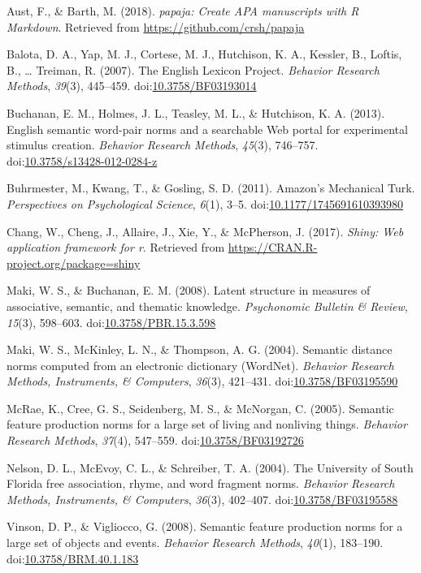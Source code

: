 \documentclass[english,man]{apa6}
\theoremstyle{definition}
\theoremstyle{definition}
\theoremstyle{definition}
\theoremstyle{remark}
\begin{document}
\setlength{\parindent}{-0.5in} \setlength{\leftskip}{0.5in}

\hypertarget{refs}{}
\hypertarget{ref-R-papaja}{}
Aust, F., \& Barth, M. (2018). \emph{papaja: Create APA manuscripts with
R Markdown}. Retrieved from \url{https://github.com/crsh/papaja}

\hypertarget{ref-Balota2007}{}
Balota, D. A., Yap, M. J., Cortese, M. J., Hutchison, K. A., Kessler,
B., Loftis, B., \ldots{} Treiman, R. (2007). The English Lexicon
Project. \emph{Behavior Research Methods}, \emph{39}(3), 445--459.
doi:\href{https://doi.org/10.3758/BF03193014}{10.3758/BF03193014}

\hypertarget{ref-Buchanan2013}{}
Buchanan, E. M., Holmes, J. L., Teasley, M. L., \& Hutchison, K. A.
(2013). English semantic word-pair norms and a searchable Web portal for
experimental stimulus creation. \emph{Behavior Research Methods},
\emph{45}(3), 746--757.
doi:\href{https://doi.org/10.3758/s13428-012-0284-z}{10.3758/s13428-012-0284-z}

\hypertarget{ref-Buhrmester2011}{}
Buhrmester, M., Kwang, T., \& Gosling, S. D. (2011). Amazon's Mechanical
Turk. \emph{Perspectives on Psychological Science}, \emph{6}(1), 3--5.
doi:\href{https://doi.org/10.1177/1745691610393980}{10.1177/1745691610393980}

\hypertarget{ref-R-shiny}{}
Chang, W., Cheng, J., Allaire, J., Xie, Y., \& McPherson, J. (2017).
\emph{Shiny: Web application framework for r}. Retrieved from
\url{https://CRAN.R-project.org/package=shiny}

\hypertarget{ref-Maki2008}{}
Maki, W. S., \& Buchanan, E. M. (2008). Latent structure in measures of
associative, semantic, and thematic knowledge. \emph{Psychonomic
Bulletin \& Review}, \emph{15}(3), 598--603.
doi:\href{https://doi.org/10.3758/PBR.15.3.598}{10.3758/PBR.15.3.598}

\hypertarget{ref-Maki2004}{}
Maki, W. S., McKinley, L. N., \& Thompson, A. G. (2004). Semantic
distance norms computed from an electronic dictionary (WordNet).
\emph{Behavior Research Methods, Instruments, \& Computers},
\emph{36}(3), 421--431.
doi:\href{https://doi.org/10.3758/BF03195590}{10.3758/BF03195590}

\hypertarget{ref-McRae2005}{}
McRae, K., Cree, G. S., Seidenberg, M. S., \& McNorgan, C. (2005).
Semantic feature production norms for a large set of living and
nonliving things. \emph{Behavior Research Methods}, \emph{37}(4),
547--559.
doi:\href{https://doi.org/10.3758/BF03192726}{10.3758/BF03192726}

\hypertarget{ref-Nelson2004}{}
Nelson, D. L., McEvoy, C. L., \& Schreiber, T. A. (2004). The University
of South Florida free association, rhyme, and word fragment norms.
\emph{Behavior Research Methods, Instruments, \& Computers},
\emph{36}(3), 402--407.
doi:\href{https://doi.org/10.3758/BF03195588}{10.3758/BF03195588}

\hypertarget{ref-Vinson2008}{}
Vinson, D. P., \& Vigliocco, G. (2008). Semantic feature production
norms for a large set of objects and events. \emph{Behavior Research
Methods}, \emph{40}(1), 183--190.
doi:\href{https://doi.org/10.3758/BRM.40.1.183}{10.3758/BRM.40.1.183}
\end{document}
